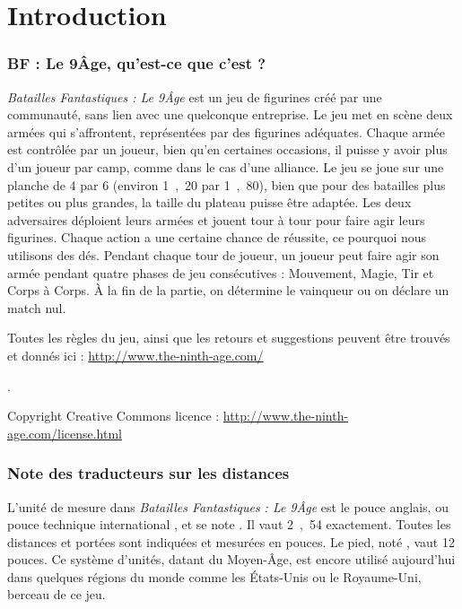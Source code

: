 
\part{Introduction}

\section{BF : Le 9\ieme Âge, qu'est-ce que c'est ?}

\emph{Batailles Fantastiques : Le 9\ieme Âge} est un jeu de figurines créé par une communauté, sans lien avec une quelconque entreprise. Le jeu met en scène deux armées qui s'affrontent, représentées par des figurines adéquates. Chaque armée est contrôlée par un joueur, bien qu'en certaines occasions, il puisse y avoir plus d'un joueur par camp, comme dans le cas d'une alliance. Le jeu se joue sur une planche de \unit{4}{\pied} par \unit{6}{\pied} (environ \unit{1,20}{\meter} par \unit{1,80}{\meter}), bien que pour des batailles plus petites ou plus grandes, la taille du plateau puisse être adaptée. Les deux adversaires déploient leurs armées et jouent tour à tour pour faire agir leurs figurines. Chaque action a une certaine chance de réussite, ce pourquoi nous utilisons des dés. Pendant chaque tour de joueur, un joueur peut faire agir son armée pendant quatre phases de jeu consécutives : Mouvement, Magie, Tir et Corps à Corps. À la fin de la partie, on détermine le vainqueur ou on déclare un match nul.

Toutes les règles du jeu, ainsi que les retours et suggestions peuvent être trouvés et donnés ici :
\url{http://www.the-ninth-age.com/}

. 

Copyright Creative Commons licence : \url{http://www.the-ninth-age.com/license.html}

\section{Note des traducteurs sur les distances}

L'unité de mesure dans \emph{Batailles Fantastiques : Le 9\ieme Âge} est le pouce anglais, ou \og pouce technique international \fg , et se note \pouce . Il vaut \unit{2,54}{\centi\meter} exactement. Toutes les distances et portées sont indiquées et mesurées en pouces. Le pied, noté \pied , vaut 12 pouces. Ce système d'unités, datant du Moyen-Âge, est encore utilisé aujourd'hui dans quelques régions du monde comme les États-Unis ou le Royaume-Uni, berceau de ce jeu.


